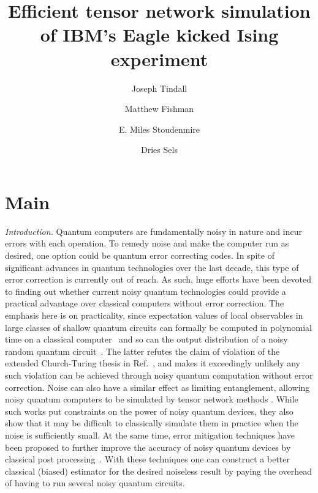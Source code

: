\documentclass[%
 superscriptaddress,
 amsmath,amssymb,
 prx, nofootinbib,
 twocolumn
]{revtex4-2}
\begin{document}
\title{Efficient tensor network simulation of IBM's Eagle kicked Ising experiment}


\author{Joseph Tindall}

\author{Matthew Fishman}

\author{E. Miles Stoudenmire}

\author{Dries Sels}



\maketitle


\section*{Main}

\emph{Introduction.} Quantum computers are fundamentally noisy in nature and incur errors with each operation. To remedy noise and make the computer run as desired, one option could be quantum error correcting codes. In spite of significant advances in quantum technologies over the last decade, this type of error correction is currently out of reach. As such, huge efforts have been devoted to finding out whether current noisy quantum technologies could provide a practical advantage over classical computers without error correction. The emphasis here is on practicality, since expectation values of local observables in large classes of shallow quantum circuits can formally be computed in polynomial time on a classical computer~\cite{bravyi21, wild23} and so can the output distribution of a noisy random quantum circuit~\cite{aharonov23}. The latter refutes the claim of violation of the extended Church-Turing thesis in Ref.~\cite{arute19}, and makes it exceedingly unlikely any such violation can be achieved through noisy quantum computation without error correction. 
Noise can also have a similar effect as limiting entanglement, allowing noisy quantum computers to be simulated by
 tensor network methods \cite{Zhou2020, Pan2022, Ayral2023}.
While such works put constraints on the power of noisy quantum devices, they also show that it may be difficult to classically simulate them in practice when the noise is sufficiently small. At the same time, error mitigation techniques have been proposed to further improve the accuracy of noisy quantum devices by classical post processing~\cite{temme17,vandenberg23}. With these techniques one can construct a better classical (biased) estimator for the desired noiseless result by paying the overhead of having to run several noisy quantum circuits.
\end{document}
